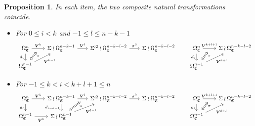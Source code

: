 \documentclass[a4paper,10pt
,draft
]{article}%
\numberwithin{equation}{section}
\numberwithin{figure}{section}
\newtheorem{proposition}[equation]{Proposition}%
\theoremstyle{definition} %
\newcommand{\1}{\ensuremath{\mathbbm 1}}%
\begin{document}
\begin{proposition}\label{CATDIAG2 PROP}
	In each item, the two composite natural transformations coincide.
	\begin{itemize}
		\item[(IT1)]
		For $0 \leq i < k $ and $-1 \leq l \leq n-k-1$
		\begin{equation}
		\begin{tikzcd}[row sep = 12pt, column sep = 18pt]
		|[alias=V]|
		\Omega_{\mathfrak{C}}^{n} \ar{r}{\boldsymbol{V}^{k}}[swap,name=UU]{} \arrow{d}[swap]{d_i}&
		\Sigma \wr \Omega_{\mathfrak{C}}^{n-k-1} \ar{r}{\boldsymbol{V}^l} &
		\Sigma^{\wr 2} \wr \Omega^{n-k-l-2}_{\mathfrak{C}} \ar{r}{\sigma^0} &
		\Sigma \wr \Omega^{n-k-l-2}_{\mathfrak{C}}
		&
		\Omega^{n}_{\mathfrak{C}} \ar{r}{\boldsymbol{V}^{k+l+1}}[swap,name=UUU]{} \arrow{d}[swap]{d_i}&
		\Sigma \wr \Omega^{n-k-l-2}_{\mathfrak{C}} &
		\\
		|[alias=VV]|
		\Omega^{n-1}_{\mathfrak{C}} \arrow{ur}[swap]{\boldsymbol{V}^{k-1}} & & &
		&
		|[alias=VVV]|
		\Omega^{n-1}_{\mathfrak{C}} \arrow{ur}[swap]{\boldsymbol{V}^{k+l}} &
		\arrow[Leftrightarrow, from=VV, to=UU,shorten >=0.05cm,shorten <=0.05cm
		,swap,near end,"\pi"
		]
		\arrow[Leftrightarrow, from=VVV, to=UUU,shorten >=0.05cm,shorten <=0.05cm
		,swap,near end,"\pi"
		]
		\end{tikzcd}
		\end{equation}
		
		\item[(IT2)]
		For $-1 \leq k < i < k + l + 1 \leq n$
		\begin{equation}
		\begin{tikzcd}[row sep = 12pt, column sep = 18pt]
		\Omega^n_{\mathfrak{C}} \ar{r}{\boldsymbol{V}^k} \ar{d}[swap]{d_i} &
		|[alias=V]|
		\Sigma \wr \Omega^{n-k-1}_{\mathfrak{C}} \ar{r}{\boldsymbol{V}^{l}}[swap,name=UU]{} \arrow{d}[swap]{d_{i-k-1}} &
		\Sigma^{\wr 2} \wr \Omega^{n-k-l-2}_{\mathfrak{C}} \ar{r}{\sigma^0} &
		\Sigma \wr \Omega^{n-k-l-2}_{\mathfrak{C}}
		&
		\Omega^{n}_{\mathfrak{C}} \ar{r}{\boldsymbol{V}^{k+l+1}}[swap,name=UUU]{} \arrow{d}[swap]{d_i}&
		\Sigma \wr \Omega^{n-k-l-2}_{\mathfrak{C}} &
		\\
		\Omega^{n-1}_{\mathfrak{C}} \ar{r}[swap]{\boldsymbol{V}^k} &
		|[alias=VV]|
		\Sigma \wr \Omega^{n-1}_{\mathfrak{C}} \arrow{ur}[swap]{\boldsymbol{V}^{l-1}} & &
		&
		|[alias=VVV]|
		\Omega^{n-1}_{\mathfrak{C}} \arrow{ur}[swap]{\boldsymbol{V}^{k+l}} &
		\arrow[Leftrightarrow, from=VV, to=UU,shorten >=0.05cm,shorten <=0.05cm
		,swap,near end,"\pi"
		]
		\arrow[Leftrightarrow, from=VVV, to=UUU,shorten >=0.05cm,shorten <=0.05cm
		,swap,near end,"\pi"
		]
		\end{tikzcd}
		\end{equation}
		

\end{itemize}
\end{proposition}
\end{document}
